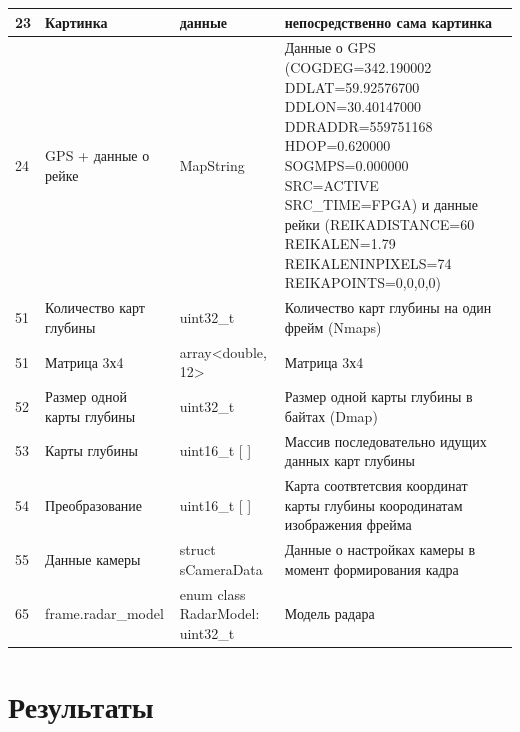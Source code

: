 \documentclass[specification,annotation,times]{itmo-student-thesis}
\begin{document}
\begin{center}
\begin{longtable}{|p{}|p{}|p{}|p{}|}
		23&	Картинка&	данные&	непосредственно сама картинка\\\hline
		24	&GPS + данные о рейке&	MapString	&Данные о GPS (COGDEG=342.190002 DDLAT=59.92576700 DDLON=30.40147000 DDRADDR=559751168 HDOP=0.620000 SOGMPS=0.000000 SRC=ACTIVE SRC\_TIME=FPGA) и данные рейки (REIKADISTANCE=60 REIKALEN=1.79 REIKALENINPIXELS=74 REIKAPOINTS=0,0,0,0)\\\hline
		51&	Количество карт глубины	&uint32\_t	&Количество карт глубины на один фрейм (Nmaps)\\\hline
		51&	Матрица 3х4	&array<double, 12>	&Матрица 3х4\\\hline
		52	&Размер одной карты глубины	&uint32\_t	&Размер одной карты глубины в байтах (Dmap)\\\hline
		53&	Карты глубины	&uint16\_t [ ]&	Массив последовательно идущих данных карт глубины\\\hline
		54	&Преобразование	&uint16\_t [ ]&	Карта соотвтетсвия координат карты глубины коородинатам изображения фрейма\\\hline
		55&	Данные камеры&	struct sCameraData	&Данные о настройках камеры в момент формирования кадра\\\hline
		65&	frame.radar\_model&	enum class RadarModel: uint32\_t	&Модель радара\\\hline
	\end{longtable}
\end{center}

\chapter{Результаты}\label{sec:app:2}
\end{document}
